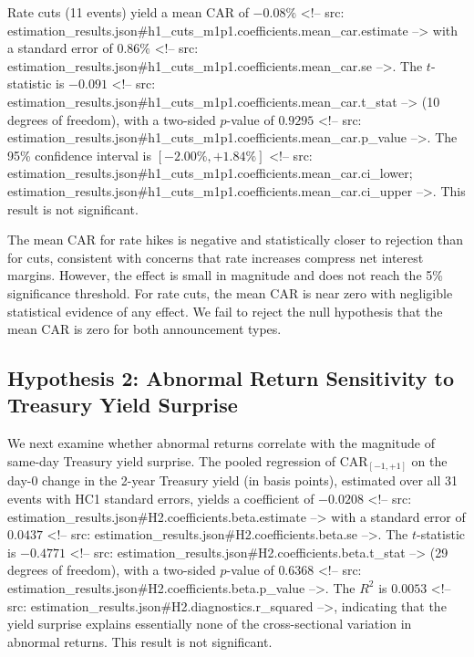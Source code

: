 \documentclass[11pt]{article}
\begin{document}
Rate cuts (11 events) yield a mean CAR of $-0.08\%$ <!-- src: estimation_results.json#h1_cuts_m1p1.coefficients.mean_car.estimate --> with a standard error of $0.86\%$ <!-- src: estimation_results.json#h1_cuts_m1p1.coefficients.mean_car.se -->. The $t$-statistic is $-0.091$ <!-- src: estimation_results.json#h1_cuts_m1p1.coefficients.mean_car.t_stat --> (10 degrees of freedom), with a two-sided $p$-value of $0.9295$ <!-- src: estimation_results.json#h1_cuts_m1p1.coefficients.mean_car.p_value -->. The 95\% confidence interval is $[-2.00\%, +1.84\%]$ <!-- src: estimation_results.json#h1_cuts_m1p1.coefficients.mean_car.ci_lower; estimation_results.json#h1_cuts_m1p1.coefficients.mean_car.ci_upper -->. This result is not significant.

The mean CAR for rate hikes is negative and statistically closer to rejection than for cuts, consistent with concerns that rate increases compress net interest margins. However, the effect is small in magnitude and does not reach the 5\% significance threshold. For rate cuts, the mean CAR is near zero with negligible statistical evidence of any effect. We fail to reject the null hypothesis that the mean CAR is zero for both announcement types.

\subsection{Hypothesis 2: Abnormal Return Sensitivity to Treasury Yield Surprise}



We next examine whether abnormal returns correlate with the magnitude of same-day Treasury yield surprise. The pooled regression of CAR$_{[-1, +1]}$ on the day-0 change in the 2-year Treasury yield (in basis points), estimated over all 31 events with HC1 standard errors, yields a coefficient of $-0.0208$ <!-- src: estimation_results.json#H2.coefficients.beta.estimate --> with a standard error of $0.0437$ <!-- src: estimation_results.json#H2.coefficients.beta.se -->. The $t$-statistic is $-0.4771$ <!-- src: estimation_results.json#H2.coefficients.beta.t_stat --> (29 degrees of freedom), with a two-sided $p$-value of $0.6368$ <!-- src: estimation_results.json#H2.coefficients.beta.p_value -->. The $R^2$ is $0.0053$ <!-- src: estimation_results.json#H2.diagnostics.r_squared -->, indicating that the yield surprise explains essentially none of the cross-sectional variation in abnormal returns. This result is not significant.
\end{document}
